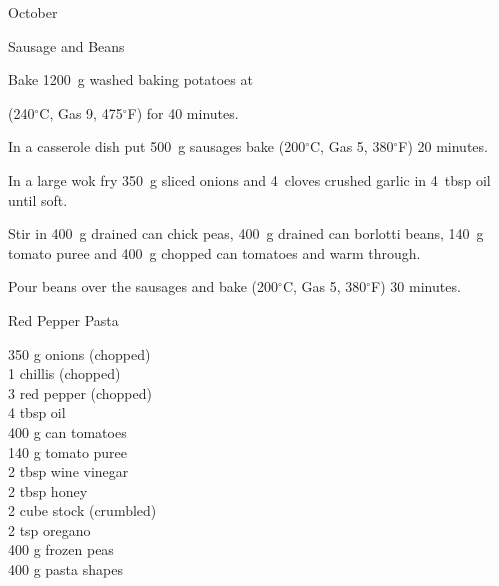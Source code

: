 \begin{menu}{October}
\begin{recipe}{2}{Sausage and Beans}
\begin{ingredients}
		\end{ingredients}
	
    \begin{instructions}
    \item 
      Bake 1200~g washed baking potatoes
      at
      
      (240$^{\circ}$C, Gas 9, 475$^{\circ}$F)
     for 40 minutes.
    \item 
        In a casserole dish put
        500~g  sausages
        bake 
      (200$^{\circ}$C, Gas 5, 380$^{\circ}$F)
     20 minutes.
      \item 
        In a large wok fry
        350~g sliced onions
        and
        4~cloves crushed garlic
        in
        4~tbsp  oil
        until soft.
      \item 
        Stir in
        400~g drained can chick peas,
        400~g drained can borlotti beans,
        140~g  tomato puree
        and
        400~g chopped can tomatoes
        and warm through.
      \item 
        Pour beans over the sausages and bake 
      (200$^{\circ}$C, Gas 5, 380$^{\circ}$F)
     30 minutes.
      
    \end{instructions}
    \end{recipe}%
  
    \begin{recipe}{2}{Red Pepper Pasta}%
    
		\begin{ingredients}
		350 g onions (chopped) \\
	1  chillis (chopped) \\
	3  red pepper (chopped) \\
	4 tbsp oil  \\
	400 g can tomatoes  \\
	140 g tomato puree  \\
	2 tbsp wine vinegar  \\
	2 tbsp honey  \\
	2 cube stock (crumbled) \\
	2 tsp oregano  \\
	400 g frozen peas  \\
	400 g pasta shapes  \\
	
		\end{ingredients}
	

\end{recipe}
\end{menu}
